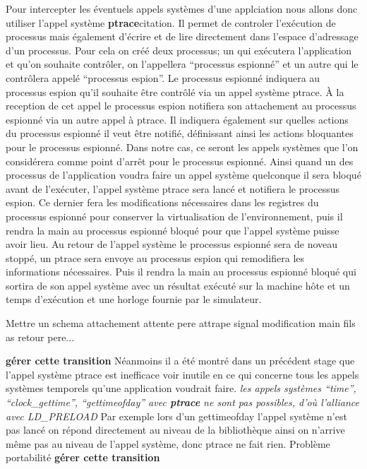 Pour intercepter les éventuels appels systèmes d'une applciation nous allons
donc utiliser l'appel système \textbf{ptrace}{\color{red}citation}. Il permet de
controler l'exécution de processus mais également d'écrire et de lire
directement dans l'espace d'adressage d'un processus. Pour cela on créé deux
processus; un qui exécutera l'application et qu'on souhaite contrôler, on
l'appellera ``processus espionné'' et un autre qui le contrôlera appelé
``processus espion''. Le processus espionné indiquera au processus espion qu'il
souhaite être contrôlé via un appel système ptrace. À la reception de cet appel
le processus espion notifiera son attachement au processus espionné via un autre
appel à ptrace. Il indiquera également sur quelles actions du processus espionné
il veut être notifié, définissant ainsi les actions bloquantes pour le processus
espionné. Dans notre cas, ce seront les appels systèmes que l'on considérera
comme point d'arrêt pour le processus espionné. Ainsi quand un des processus de
l'application voudra faire un appel système quelconque il sera bloqué avant de
l'exécuter, l'appel système ptrace sera lancé et notifiera le processus
espion. Ce dernier fera les modifications nécessaires dans les registres du
processus espionné pour conserver la virtualisation de l'environnement, puis il
rendra la main au processus espionné bloqué pour que l'appel système puisse
avoir lieu. Au retour de l'appel système le processus espionné sera de noveau
stoppé, un ptrace sera envoye au processus espion qui remodifiera les
informations nécessaires. Puis il rendra la main au processus espionné bloqué
qui sortira de son appel système avec un résultat exécuté sur la machine hôte et
un temps d'exécution et une horloge fournie par le simulateur.

{\color{red} Mettre un schema attachement attente pere attrape signal modification main fils as retour pere...}

{\color{red} \textbf{gérer cette transition}} Néanmoins il a été montré dans un
précédent stage que l'appel système ptrace est inefficace voir inutile en ce qui
concerne tous les appels systèmes temporels qu'une application voudrait
faire. \textit{les appels systèmes ``time'', ``clock\_gettime'',
  ``gettimeofday'' avec \textbf{ptrace} ne sont pas possibles, d'où l'alliance
  avec LD\_PRELOAD} Par exemple lors d'un gettimeofday l'appel système n'est pas
lancé on répond directement au niveau de la bibliothèque ainsi on n'arrive même
pas au niveau de l'appel système, donc ptrace ne fait rien.  Problème
portabilité {\color{red} \textbf{gérer cette transition}}

